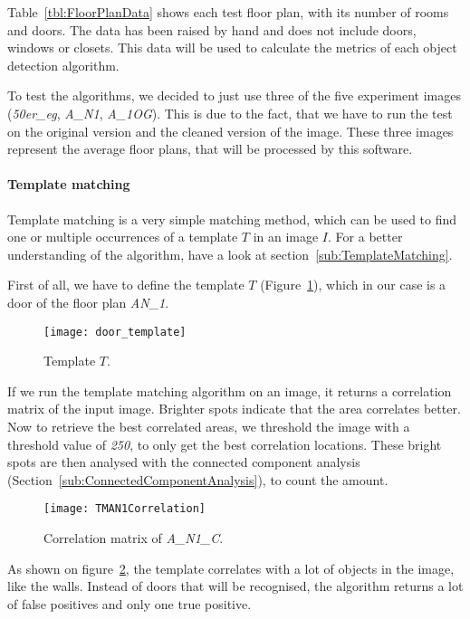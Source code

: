 Table~\ref{tbl:FloorPlanData} shows each test floor plan, with its number of rooms and doors. The data has been raised by hand and does not include doors, windows or closets. This data will be used to calculate the metrics of each object detection algorithm.

To test the algorithms, we decided to just use three of the five experiment images (\textit{50er\_eg}, \textit{A\_N1}, \textit{A\_1OG}). This is due to the fact, that we have to run the test on the original version and the cleaned version of the image. These three images represent the average floor plans, that will be processed by this software.

\paragraph{Template matching}
\label{sub:ImpTemplateMatching}

Template matching is a very simple matching method, which can be used to find one or multiple occurrences of a template $T$ in an image $I$. For a better understanding of the algorithm, have a look at section~\ref{sub:TemplateMatching}.

First of all, we have to define the template $T$ (Figure~\ref{fig:DoorTemplate}), which in our case is a door of the floor plan \textit{AN\_1}.

\begin{figure}[H]
	\centering
	\texttt{[image: door\_template]}
	\caption{Template $T$.}
	\label{fig:DoorTemplate}
\end{figure}

If we run the template matching algorithm on an image, it returns a correlation matrix of the input image. Brighter spots indicate that the area correlates better. Now to retrieve the best correlated areas, we threshold the image with a threshold value of \textit{250}, to only get the best correlation locations. These bright spots are then analysed with the connected component analysis (Section~\ref{sub:ConnectedComponentAnalysis}), to count the amount.

\begin{figure}[H]
	\centering
	\texttt{[image: TMAN1Correlation]}
	\caption{Correlation matrix of \textit{A\_N1\_C}.}
	\label{fig:TMAN1Correlation}
\end{figure}

As shown on figure~\ref{fig:TMAN1Correlation}, the template correlates with a lot of objects in the image, like the walls. Instead of doors that will be recognised, the algorithm returns a lot of false positives and only one true positive.


